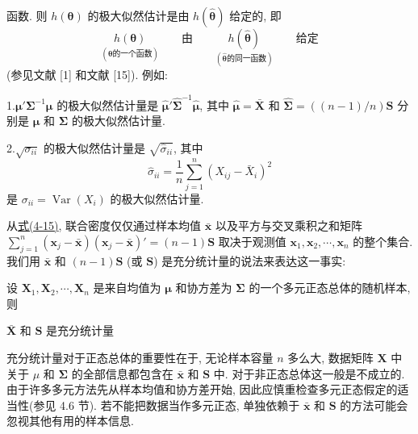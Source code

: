 
函数. 则 $h(\boldsymbol{\theta})$ 的极大似然估计是由 $h(\hat{\boldsymbol{\theta}})$ 给定的, 即
\label{eq:4-20}
\begin{equation}
\underset{(\boldsymbol{\theta}\text{的一个函数})}{h(\boldsymbol{\theta})}\qquad\text{由}\qquad\underset{(\hat{\boldsymbol{\theta}}\text{的同一函数})}{h(\hat{\boldsymbol{\theta}})}\qquad\text{给定} \tag{4-20}
\end{equation}
(参见文献 [1] 和文献 [15]). 例如:

1.\quad $\boldsymbol{\mu}'\boldsymbol{\Sigma}^{-1}\boldsymbol{\mu}$ 的极大似然估计量是 $\hat{\boldsymbol{\mu}}'\hat{\boldsymbol{\Sigma}}^{-1}\hat{\boldsymbol{\mu}}$, 其中 $\hat{\boldsymbol{\mu}}=\bar{\mathbf{X}}$ 和 $\hat{\boldsymbol{\Sigma}}=((n-1)/n)\mathbf{S}$ 分别是 $\boldsymbol{\mu}$ 和 $\boldsymbol{\Sigma}$ 的极大似然估计量.

2.\quad $\sqrt{\sigma_{ii}}$ 的极大似然估计量是 $\sqrt{\hat{\sigma}_{ii}}$, 其中
\[
\hat{\sigma}_{ii}=\frac{1}{n}\sum_{j=1}^{n}(X_{ij}-\bar{X}_{i})^{2}
\]
是 $\sigma_{ii}=\operatorname{Var}(X_{i})$ 的极大似然估计量.


从\hyperref[eq:4-15]{式(4-15)}, 联合密度仅仅通过样本均值 $\bar{\mathbf{x}}$ 以及平方与交叉乘积之和矩阵 $\sum_{j=1}^{n}(\mathbf{x}_{j}-\bar{\mathbf{x}})(\mathbf{x}_{j}-\bar{\mathbf{x}})'=(n-1)\mathbf{S}$ 取决于观测值 $\mathbf{x}_{1},\mathbf{x}_{2},\cdots,\mathbf{x}_{n}$ 的整个集合. 我们用 $\bar{\mathbf{x}}$ 和 $(n-1)\mathbf{S}$ (或 $\mathbf{S}$) 是充分统计量的说法来表达这一事实:

\begin{mvbox}
设 $\mathbf{X}_{1},\mathbf{X}_{2},\cdots,\mathbf{X}_{n}$ 是来自均值为 $\boldsymbol{\mu}$ 和协方差为 $\boldsymbol{\Sigma}$ 的一个多元正态总体的随机样本, 则

$\bar{\mathbf{X}}$ 和 $\mathbf{S}$ 是充分统计量
\label{eq:4-21}
\begin{equation}
\tag{4-21}
\end{equation}
\end{mvbox}

充分统计量对于正态总体的重要性在于, 无论样本容量 $n$ 多么大, 数据矩阵 $\mathbf{X}$ 中关于 $\mu$ 和 $\boldsymbol{\Sigma}$ 的全部信息都包含在 $\bar{\mathbf{x}}$ 和 $\mathbf{S}$ 中. 对于非正态总体这一般是不成立的. 由于许多多元方法先从样本均值和协方差开始, 因此应慎重检查多元正态假定的适当性(参见 4.6 节). 若不能把数据当作多元正态, 单独依赖于 $\bar{\mathbf{x}}$ 和 $\mathbf{S}$ 的方法可能会忽视其他有用的样本信息.

